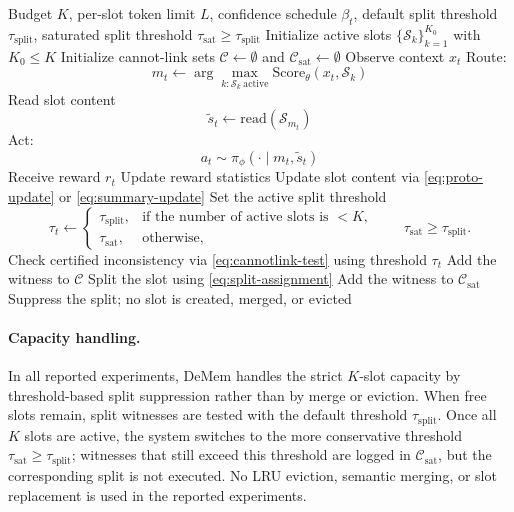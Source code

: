 \documentclass{article}
\theoremstyle{plain}
\theoremstyle{definition}
\theoremstyle{remark}
\newcommand{\Score}{\mathrm{Score}}
\newcommand{\MemRead}{\mathrm{read}}
\begin{document}
\begin{algorithm}[t]
\caption{Budgeted Agent Memory with Certified Splits}
\label{alg:agent_memory_instantiation}
\begin{algorithmic}[1]
\Require Budget \(K\), per-slot token limit \(L\), confidence schedule \(\beta_t\), default split threshold \(\tau_{\mathrm{split}}\), saturated split threshold \(\tau_{\mathrm{sat}}\ge\tau_{\mathrm{split}}\)
\State Initialize active slots \(\{\mathcal S_k\}_{k=1}^{K_0}\) with \(K_0\le K\)
\State Initialize cannot-link sets
\(\mathcal C\gets\emptyset\) and
\(\mathcal C_{\mathrm{sat}}\gets\emptyset\)
    \State Observe context \(x_t\)
    \State Route:
    \[
    m_t \gets
    \arg\max_{k:\mathcal S_k\ \mathrm{active}}
    \Score_\theta(x_t,\mathcal S_k)
    \]
    \State Read slot content
    \[
    \tilde s_t\gets \MemRead(\mathcal S_{m_t})
    \]
    \State Act:
    \[
    a_t\sim \pi_\phi(\cdot\mid m_t,\tilde s_t)
    \]
    \State Receive reward \(r_t\)
    \State Update reward statistics
    \State Update slot content via \eqref{eq:proto-update} or \eqref{eq:summary-update}
    \State Set the active split threshold
    \[
    \tau_t \gets
    \begin{cases}
    \tau_{\mathrm{split}}, & \text{if the number of active slots is } <K,\\
    \tau_{\mathrm{sat}}, & \text{otherwise},
    \end{cases}
    \qquad
    \tau_{\mathrm{sat}}\ge \tau_{\mathrm{split}} .
    \]
    \State Check certified inconsistency via \eqref{eq:cannotlink-test} using threshold \(\tau_t\)
            \State Add the witness to \(\mathcal C\)
            \State Split the slot using \eqref{eq:split-assignment}
        \Else
            \State Add the witness to \(\mathcal C_{\mathrm{sat}}\)
            \State Suppress the split; no slot is created, merged, or evicted
        \EndIf
    \EndIf
\EndFor
\end{algorithmic}
\end{algorithm}

\paragraph{Capacity handling.}
In all reported experiments, DeMem handles the strict \(K\)-slot
capacity by threshold-based split suppression rather than by merge or
eviction. When free slots remain, split witnesses are tested with the default
threshold \(\tau_{\mathrm{split}}\). Once all \(K\) slots are active, the
system switches to the more conservative threshold
\(\tau_{\mathrm{sat}}\ge\tau_{\mathrm{split}}\); witnesses that still exceed
this threshold are logged in \(\mathcal C_{\mathrm{sat}}\), but the
corresponding split is not executed. No LRU eviction, semantic merging, or
slot replacement is used in the reported experiments.
\end{document}
